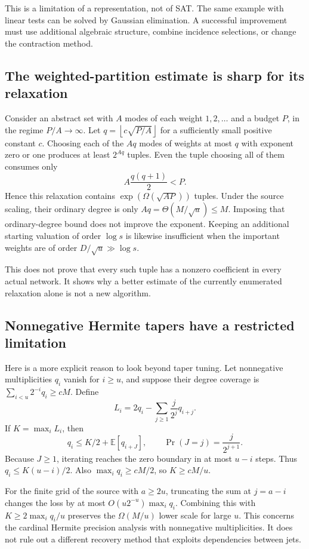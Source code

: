 \documentclass[11pt]{article}
\theoremstyle{definition}
\theoremstyle{remark}
\newcommand{\floor}[1]{\left\lfloor #1\right\rfloor}
\begin{document}
This is a limitation of a representation, not of SAT. The same example with
linear tests can be solved by Gaussian elimination. A successful improvement
must use additional algebraic structure, combine incidence selections, or
change the contraction method.

\subsection{The weighted-partition estimate is sharp for its relaxation}
Consider an abstract set with $A$ modes of each weight $1,2,\ldots$ and a
budget $P$, in the regime $P/A\to\infty$. Let $q=\floor{c\sqrt{P/A}}$ for a sufficiently small positive
constant $c$. Choosing each of the $Aq$ modes of weights at most $q$ with
exponent zero or one produces at least $2^{Aq}$ tuples. Even the tuple choosing
all of them consumes only
\[
 A\frac{q(q+1)}2<P.
\]
Hence this relaxation contains $\exp(\Omega(\sqrt{AP}))$ tuples.
Under the source scaling, their ordinary degree is only
$Aq=\Theta(M/\sqrt u)\le M$. Imposing that ordinary-degree bound does not
improve the exponent. Keeping an additional starting valuation of order
$\log s$ is likewise insufficient when the important weights are of order
$D/\sqrt u\gg\log s$.

This does not prove that every such tuple has a nonzero coefficient in every
actual network. It shows why a better estimate of the currently enumerated
relaxation alone is not a new algorithm.

\subsection{Nonnegative Hermite tapers have a restricted limitation}
Here is a more explicit reason to look beyond taper tuning. Let nonnegative
multiplicities $q_i$ vanish for $i\ge u$, and suppose their degree coverage is
$\sum_{i<u}2^{-i}q_i\ge cM$. Define
\[
 L_i=2q_i-\sum_{j\ge1}\frac{j}{2^j}q_{i+j}.
\]
If $K=\max_iL_i$, then
\[
 q_i\le K/2+\mathbb E[q_{i+J}],\qquad
 \Pr(J=j)=\frac{j}{2^{j+1}}.
\]
Because $J\ge1$, iterating reaches the zero boundary in at most $u-i$ steps.
Thus $q_i\le K(u-i)/2$. Also
$\max_iq_i\ge cM/2$, so $K\ge cM/u$.

For the finite grid of the source with $a\ge2u$, truncating the sum at
$j=a-i$ changes the loss by at most
$O(u2^{-u})\max_iq_i$. Combining this with
$K\ge2\max_iq_i/u$ preserves the $\Omega(M/u)$ lower scale for large
$u$. This concerns the cardinal Hermite precision analysis with nonnegative
multiplicities. It does not rule out a different recovery method that exploits
dependencies between jets.
\end{document}
